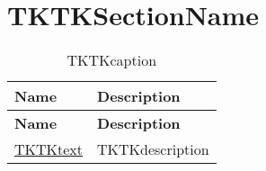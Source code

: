 \clearpage
\section{TKTKSectionName}
\setlength\LTleft{0pt}
\setlength\LTright{0pt}
\begin{longtable}[c]{|p{}|p{}|}
  \hline
  \rowcolor{owasplightpurple}
  \textbf{Name} &
  \textbf{Description}\\
  \hline
  \endfirsthead
  \hline
  \rowcolor{owasplightpurple}
  \textbf{Name} &
  \textbf{Description} \\
  \hline
  \endhead
  \endfoot
  \href{TKTKlink}{TKTKtext} &
  TKTKdescription
  \hline
  \caption{TKTKcaption}
  \label{tab:TKTKlabel}
\end{longtable}